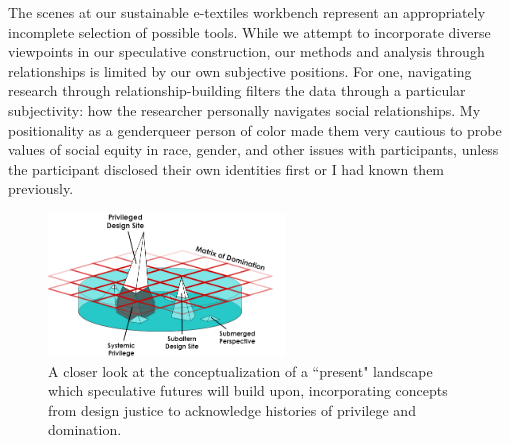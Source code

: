The scenes at our sustainable e-textiles workbench represent an appropriately incomplete selection of possible tools. While we attempt to incorporate diverse viewpoints in our speculative construction, our methods and analysis through relationships is limited by our own subjective positions.
For one, navigating research through relationship-building filters the data through a particular subjectivity: how the researcher personally navigates social relationships. My positionality as a genderqueer person of color made them very cautious to probe values of social equity in race, gender, and other issues with participants, unless the participant disclosed their own identities first or I had known them previously.

\begin{figure}[ht]
  \centering
  \includegraphics[height=1.5in]{figs/EST_Matrix of Dom_Submerged Perspectives.png}
  \caption[An illustration of the ``present'' point of the futures cone incorporating design justice concepts.]{A closer look at the conceptualization of a ``present" landscape which speculative futures will build upon, incorporating concepts from design justice to acknowledge histories of privilege and domination.}
  \label{fig:matrix-of-domination}
\end{figure}

